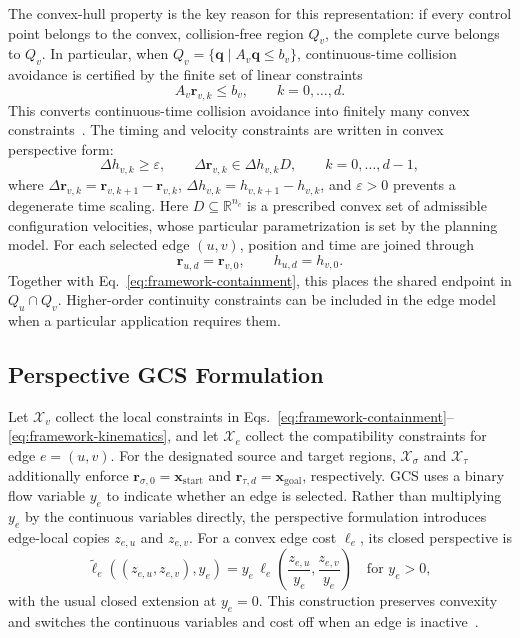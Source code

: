 The convex-hull property is the key reason for this representation: if every
control point belongs to the convex, collision-free region $Q_v$, the complete
curve belongs to $Q_v$. In particular, when
$Q_v=\{\mathbf{q}\mid A_v\mathbf{q}\leq b_v\}$, continuous-time collision
avoidance is certified by the finite set of linear constraints
\begin{equation}
  A_v\mathbf{r}_{v,k}\leq b_v,\qquad k=0,\ldots,d.
  \label{eq:framework-containment}
\end{equation}
This converts continuous-time collision avoidance into finitely many convex
constraints~\cite{MarcucciEtAl2023MotionPlanning}.
The timing and velocity constraints are written in convex perspective form:
\begin{equation}
  \Delta h_{v,k}\geq\varepsilon,\qquad
  \Delta\mathbf{r}_{v,k}\in\Delta h_{v,k}D,\qquad k=0,\ldots,d-1,
  \label{eq:framework-kinematics}
\end{equation}
where $\Delta\mathbf{r}_{v,k}=\mathbf{r}_{v,k+1}-\mathbf{r}_{v,k}$,
$\Delta h_{v,k}=h_{v,k+1}-h_{v,k}$, and $\varepsilon>0$ prevents a degenerate
time scaling.  Here $D\subseteq\mathbb{R}^{n_c}$ is a prescribed convex set of
admissible configuration velocities, whose particular parametrization is set
by the planning model.  For each selected edge $(u,v)$,
position and time are joined through
\begin{equation}
  \mathbf{r}_{u,d}=\mathbf{r}_{v,0},
  \qquad h_{u,d}=h_{v,0}.
  \label{eq:framework-c0-continuity}
\end{equation}
Together with Eq.~\eqref{eq:framework-containment}, this places the shared
endpoint in $Q_u\cap Q_v$.  Higher-order continuity constraints can be included
in the edge model when a particular application requires them.

\subsection{Perspective GCS Formulation}
\label{sec:perspective-gcs}

Let $\mathcal{X}_v$ collect the local constraints in
Eqs.~\eqref{eq:framework-containment}--\eqref{eq:framework-kinematics}, and let
$\mathcal{X}_e$ collect the compatibility constraints for edge $e=(u,v)$.  For
the designated source and target regions, $\mathcal{X}_\sigma$ and
$\mathcal{X}_\tau$ additionally enforce
$\mathbf{r}_{\sigma,0}=\mathbf{x}_{\mathrm{start}}$ and
$\mathbf{r}_{\tau,d}=\mathbf{x}_{\mathrm{goal}}$, respectively.  GCS
uses a binary flow variable $y_e$ to indicate whether an edge is selected.
Rather than multiplying $y_e$ by the continuous variables directly, the
perspective formulation introduces edge-local copies $z_{e,u}$ and $z_{e,v}$.
For a convex edge cost $\ell_e$, its closed perspective is
\begin{equation}
  \widetilde{\ell}_e((z_{e,u},z_{e,v}),y_e)
  =y_e\,\ell_e\!\left(\frac{z_{e,u}}{y_e},
                       \frac{z_{e,v}}{y_e}\right)
  \quad \text{for } y_e>0,
  \label{eq:framework-perspective-cost}
\end{equation}
with the usual closed extension at $y_e=0$. This construction preserves
convexity and switches the continuous variables and cost off when an edge is
inactive~\cite{MarcucciEtAl2023GCS}.


